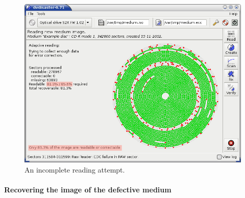 \begin{figure}[h]
\centerline{\includegraphics[width=\textwidth]{screenshots/adaptive-failure.png}}
\caption{An incomplete reading attempt.}  
\label{howto-recover-reading-failure}
\end{figure}

\newpage

\paragraph{Recovering the image of the defective medium}\quad
\label{howto-recover-fix}

\bigskip

